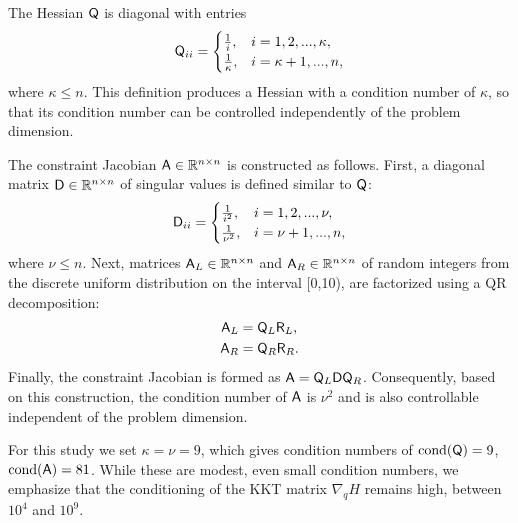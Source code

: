 The Hessian $\mathsf{Q}$ is diagonal with entries
\begin{equation*}
  \mathsf{Q}_{ii} = \begin{cases}
    \frac{1}{i}, &  i = 1, 2, ...,  \kappa, \\
    \frac{1}{\kappa}, & i =  \kappa+1, ... , n, \\
  \end{cases}
\end{equation*}
where $\kappa \leq n$.  This definition produces a Hessian with a condition
number of $\kappa$,  so that its condition number 
can be controlled independently of the problem dimension.

The constraint Jacobian $\mathsf{A} \in \mathbb{R}^{n\times n}$ is constructed as follows. First, a diagonal matrix 
$\mathsf{D} \in \mathbb{R}^{n\times n}$ of singular values is defined similar to $\mathsf{Q}$:
\begin{equation*}
  \mathsf{D}_{ii} = \begin{cases}
    \frac{1}{i^2}, &  i = 1,2,...,\nu, \\
    \frac{1}{\nu^2}, & i = \nu+1, ..., n, \\
  \end{cases}
\end{equation*}
where $\nu \leq n$.  Next, matrices $\mathsf{A}_L  \in \mathbb{R}^{n\times n} $ and $\mathsf{A}_R \in \mathbb{R}^{n\times n}$ of random integers from 
the discrete uniform distribution on the
interval [0,10),  are factorized using a QR decomposition:  
\begin{equation*}
\begin{aligned}
\mathsf{A}_L &= \mathsf{Q}_L \mathsf{R}_L, \\
\mathsf{A}_R &= \mathsf{Q}_R \mathsf{R}_R. \\
\end{aligned}
\end{equation*}
Finally, the constraint Jacobian is formed as $\mathsf{A} =\mathsf{Q}_L  \mathsf{D} \mathsf{Q}_R $.  
Consequently, based on this construction, the condition number of $\mathsf{A}$ is $\nu ^2$ and is also controllable independent of the problem dimension.

For this study we set $\kappa = \nu = 9$, which gives condition numbers of  
$ \text{cond} (\mathsf{Q} )= 9$,  $ \text{cond} (\mathsf{A}) = 81$. 
While these are modest, even small condition numbers, we emphasize that the conditioning of the KKT matrix $\nabla_q H$ remains high, between $10^4$ and $10^9$.


